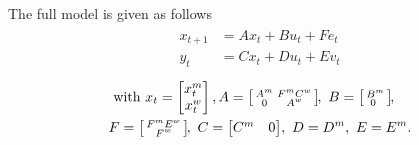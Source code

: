 \documentclass{ifacconf}
\begin{document}
The full model is given as follows
 \begin{align}  \begin{aligned}
x_{t+1}&=A x_{t} + B u_t+ Fe_t\\
y_t&=Cx_t+Du_t+Ev_t\end{aligned} \end{align}
\begin{align}& \mbox{ with }  x_t	= \begin{bmatrix}
	x^m_{t}	\\x^w_{t}
	\end{bmatrix},
A = \begin{bsmallmatrix}
 	A^m 	& F^mC^w\\
 	0 & A^w
 \end{bsmallmatrix}\!, \ 
B = \begin{bsmallmatrix} B^m \\ 0~ \end{bsmallmatrix}\!,\notag \\
&F=\begin{bsmallmatrix}
	F^m E^w \\
	F^w
	\end{bsmallmatrix}\!,\ 
C = \begin{bmatrix} C^m& 0 \end{bmatrix}\!, \ 
D= D^m, \  E = E^m.\notag
\end{align}
 
\end{document}

